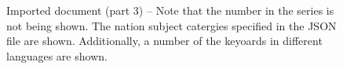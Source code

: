 \begin{figure}[!ht]
  \begin{center}
  \end{center}
  \caption[Imported document (part 3)]{Imported document (part 3) – Note that the number in the series is not being shown. The nation subject catergies specified in the JSON file are shown. Additionally, a number of the keyoards in different languages are shown.}
  \label{fig:divaImport7}
\end{figure}
\FloatBarrier

